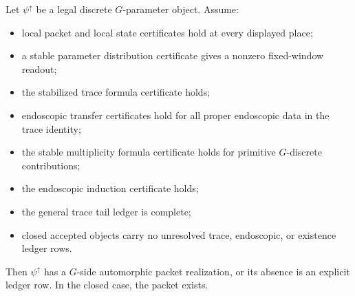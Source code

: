 \begin{theorem}
\label{thm:unified-reality-general-g-existence-bridge-cert}
Let $\psi^\uparrow$ be a legal discrete $G$-parameter object. Assume:
\begin{itemize}
\item local packet and local state certificates hold at every displayed
place;
\item a stable parameter distribution certificate gives a nonzero
fixed-window readout;
\item the stabilized trace formula certificate holds;
\item endoscopic transfer certificates hold for all proper endoscopic
data in the trace identity;
\item the stable multiplicity formula certificate holds for primitive
$G$-discrete contributions;
\item the endoscopic induction certificate holds;
\item the general trace tail ledger is complete;
\item closed accepted objects carry no unresolved trace, endoscopic, or
existence ledger rows.
\end{itemize}
Then $\psi^\uparrow$ has a $G$-side automorphic packet realization, or
its absence is an explicit ledger row. In the closed case, the packet
exists.
\end{theorem}
